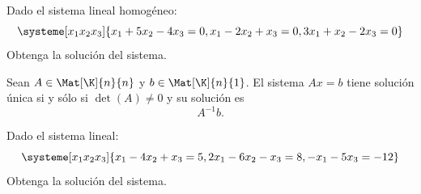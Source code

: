 \documentclass[compacto,10pt]{pubciencias-notas}
\begin{document}
\begin{ejer}
Dado el sistema lineal homogéneo:
\[
\systeme[x_1 x_2 x_3]{x_1+5x_2-4x_3=0, x_1-2x_2+x_3=0, 3x_1+x_2-2x_3=0}
\]
Obtenga la solución del sistema.
\end{ejer}
\begin{prop}
Sean $A\in\Mat[\K]{n}{n}$ y $b\in\Mat[\K]{n}{1}$. El sistema $Ax=b$ tiene solución única si y sólo si $\det(A)\neq0$ y su solución es
\[
    A^{- 1}b.
\]
\end{prop}
\begin{ejer}
Dado el sistema lineal:
\[
\systeme[x_1 x_2 x_3]{x_1-4x_2+x_3=5, 2x_1-6x_2-x_3=8, -x_1-5x_3=-12}
\]
Obtenga la solución del sistema.
\end{ejer}

\end{document}
